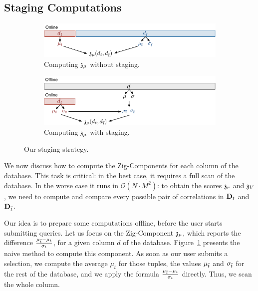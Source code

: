 \subsection{Staging Computations}
\label{sec:optimization}

\begin{figure}[t!]
    \centering
    \begin{subfigure}[b]{\columnwidth}
    \includegraphics[width=\textwidth]{Figures/Staging}
    \caption{Computing $\mathfrak{z}_\mu$ without staging.}
    \label{pic:withoutstag}
    \end{subfigure}

    \begin{subfigure}[b]{\columnwidth}
        \includegraphics[width=\textwidth]{Figures/Staging2}
    \caption{Computing  $\mathfrak{z}_\mu$  with staging.}
    \label{pic:withstag}
    \end{subfigure}
    \caption{Our staging strategy.}
\end{figure}

We now discuss how to compute the Zig-Components for each column of the
database. This task is critical: in the best case, it requires a full scan of
the database. In the worse case it runs in $\mathcal{O}(N \cdot M^2)$:  to
obtain the scores $\mathfrak{z}_r$ and $\mathfrak{z}_V$, we need to compute and compare
every possible pair of correlations in $\mathbf{D}_t$ and $\mathbf{D}_{\overline{t}}$.

Our idea is to prepare some computations offline, before the user starts
submitting queries.  Let us focus on the Zig-Component $\mathfrak{z}_\mu$, which
reports the difference $\frac{\mu_{\overline{t}} - \mu_{t}}{\sigma_t}$, for a given
column $d$ of the database.  Figure~\ref{pic:withoutstag} presents the naive
method to compute this component.  As soon as our user submits a selection, we
compute the average $\mu_t$ for those tuples, the values $\mu_{\overline{t}}$ and
$\sigma_{\overline{t}}$ for the rest of the database, and we apply the formula
$\frac{\mu_{\overline{t}} - \mu_{t}}{\sigma_t}$  directly. Thus, we scan the whole
column.

